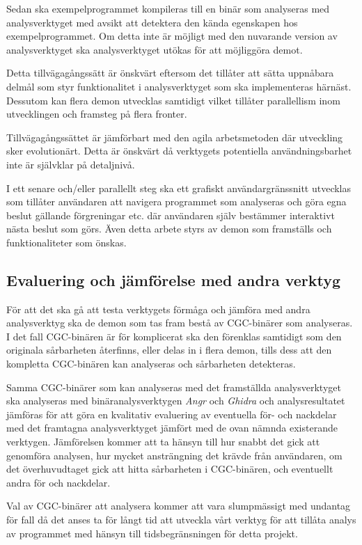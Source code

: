 Sedan ska exempelprogrammet kompileras till en binär som analyseras med
analysverktyget med avsikt att detektera den kända egenskapen hos
exempelprogrammet. Om detta inte är möjligt med den nuvarande version av
analysverktyget ska analysverktyget utökas för att möjliggöra demot.

Detta tillvägagångssätt är önskvärt eftersom det tillåter att sätta uppnåbara
delmål som styr funktionalitet i analysverktyget som ska implementeras härnäst.
Dessutom kan flera demon utvecklas samtidigt vilket tillåter parallellism inom
utvecklingen och framsteg på flera fronter.

Tillvägagångssättet är jämförbart med den agila arbetsmetoden där utveckling sker 
evolutionärt. Detta är önskvärt då verktygets potentiella 
användningsbarhet inte är självklar på detaljnivå.

I ett senare och/eller parallellt steg ska ett grafiskt användargränssnitt
utvecklas som tillåter användaren att navigera programmet som analyseras och
göra egna beslut gällande förgreningar etc. där användaren själv bestämmer
interaktivt nästa beslut som görs. Även detta arbete styrs av demon som
framställs och funktionaliteter som önskas.

\subsection{Evaluering och jämförelse med andra verktyg}

För att det ska gå att testa verktygets förmåga och jämföra med andra
analysverktyg ska de demon som tas fram bestå av CGC-binärer som analyseras. I
det fall CGC-binären är för komplicerat ska den förenklas samtidigt som den
originala sårbarheten återfinns, eller delas in i flera demon, tills dess att
den kompletta CGC-binären kan analyseras och sårbarheten detekteras.

Samma CGC-binärer som kan analyseras med det framställda analysverktyget ska
analyseras med binäranalysverktygen \emph{Angr} och \emph{Ghidra} och
analysresultatet jämföras för att göra en kvalitativ evaluering av eventuella
för- och nackdelar med det framtagna analysverktyget jämfört med de ovan nämnda
existerande verktygen. Jämförelsen kommer att ta hänsyn till hur snabbt det
gick att genomföra analysen, hur mycket ansträngning det krävde från
användaren, om det överhuvudtaget gick att hitta sårbarheten i CGC-binären, och
eventuellt andra för och nackdelar.

Val av CGC-binärer att analysera kommer att vara slumpmässigt med undantag för
fall då det anses ta för långt tid att utveckla vårt verktyg för att tillåta
analys av programmet med hänsyn till tidsbegränsningen för detta projekt.
